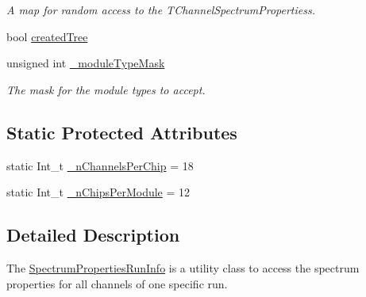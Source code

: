 \begin{DoxyCompactItemize}
\begin{DoxyCompactList}\small\item\em A map for random access to the T\-Channel\-Spectrum\-Propertiess. \end{DoxyCompactList}\item 
bool \hyperlink{class_spectrum_properties_run_info_afcbed8adc08c7cfbca19df402943a770}{created\-Tree}
\item 
unsigned int \hyperlink{class_spectrum_properties_run_info_a4d7328dfa2acc72cbaaf1b897c975b62}{\-\_\-module\-Type\-Mask}
\begin{DoxyCompactList}\small\item\em The mask for the module types to accept. \end{DoxyCompactList}\end{DoxyCompactItemize}
\subsection*{Static Protected Attributes}
\begin{DoxyCompactItemize}
\item 
static Int\-\_\-t \hyperlink{class_spectrum_properties_run_info_ac56bc4e28473056ac6daad4a7645fbf9}{\-\_\-n\-Channels\-Per\-Chip} = 18
\item 
static Int\-\_\-t \hyperlink{class_spectrum_properties_run_info_a67b550f7e4ba507ae8953f57c15f62f3}{\-\_\-n\-Chips\-Per\-Module} = 12
\end{DoxyCompactItemize}


\subsection{Detailed Description}
The \hyperlink{class_spectrum_properties_run_info}{Spectrum\-Properties\-Run\-Info} is a utility class to access the spectrum properties for all channels of one specific run. 

